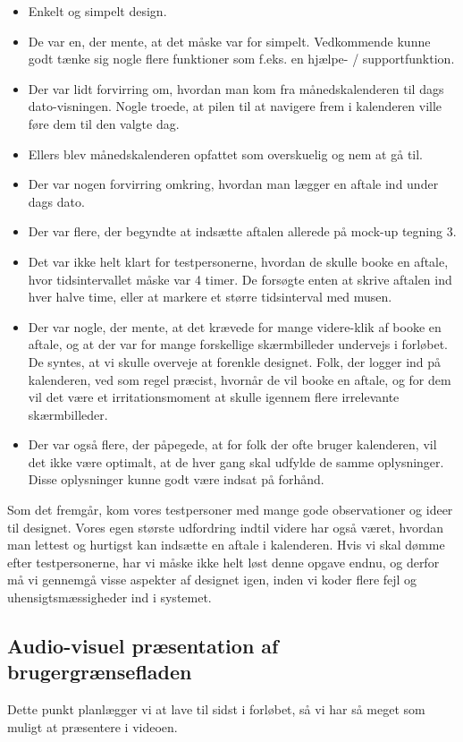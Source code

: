 \documentclass[12pt]{article}   %
\begin{document}
\begin{itemize}
\item Enkelt og simpelt design.
\item De var en, der mente, at det måske var for simpelt. Vedkommende kunne godt tænke sig nogle flere funktioner som f.eks. en hjælpe- / supportfunktion.
\item Der var lidt forvirring om, hvordan man kom fra månedskalenderen til dags dato-visningen. Nogle troede, at pilen til at navigere frem i kalenderen ville føre dem til den valgte dag. 
\item Ellers blev månedskalenderen opfattet som overskuelig og nem at gå til. 
\item Der var nogen forvirring omkring, hvordan man lægger en aftale ind under dags dato.
\item Der var flere, der begyndte at indsætte aftalen allerede på mock-up tegning 3. 
\item Det var ikke helt klart for testpersonerne, hvordan de skulle booke en aftale, hvor tidsintervallet måske var 4 timer. De forsøgte enten at skrive aftalen ind hver halve time, eller at markere et større tidsinterval med musen.
\item Der var nogle, der mente, at det krævede for mange videre-klik af booke en aftale, og at der var for mange forskellige skærmbilleder undervejs i forløbet. De syntes, at vi skulle overveje at forenkle designet. Folk, der logger ind på kalenderen, ved som regel præcist, hvornår de vil booke en aftale, og for dem vil det være et irritationsmoment at skulle igennem flere irrelevante skærmbilleder. 
\item Der var også flere, der påpegede, at for folk der ofte bruger kalenderen, vil det ikke være optimalt, at de hver gang skal udfylde de samme oplysninger. Disse oplysninger kunne godt være indsat på forhånd.
\end{itemize}

Som det fremgår, kom vores testpersoner med mange gode observationer og ideer til designet. Vores egen største udfordring indtil videre har også været, hvordan man lettest og hurtigst kan indsætte en aftale i kalenderen. Hvis vi skal dømme efter testpersonerne, har vi måske ikke helt løst denne opgave endnu, og derfor må vi gennemgå visse aspekter af designet igen, inden vi koder flere fejl og uhensigtsmæssigheder ind i systemet. \\

\subsection{Audio-visuel præsentation af brugergrænsefladen}
Dette punkt planlægger vi at lave til sidst i forløbet, så vi har så meget som muligt at præsentere i videoen. 
\end{document}
